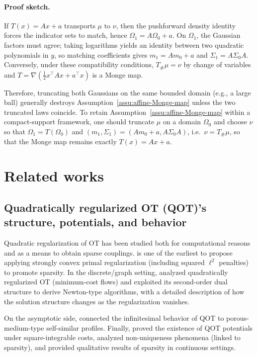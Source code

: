 \documentclass{article}
\theoremstyle{plain}
\theoremstyle{definition}
\theoremstyle{remark}
\numberwithin{equation}{section}
\begin{document}
\paragraph{Proof sketch.}
If $T(x)=Ax+a$ transports $\mu$ to $\nu$, then the pushforward density identity forces the indicator sets to match, hence $\Omega_1=A\Omega_0+a$.
On $\Omega_1$, the Gaussian factors must agree; taking logarithms yields an identity between two quadratic polynomials in $y$, so matching coefficients gives $m_1=Am_0+a$ and $\Sigma_1=A\Sigma_0A$.
Conversely, under these compatibility conditions, $T_\#\mu=\nu$ by change of variables and $T=\nabla(\frac12 x^\top Ax+a^\top x)$ is a Monge map.

Therefore, truncating both Gaussians on the same bounded domain (e.g., a large ball) generally destroys Assumption~\ref{assu:affine-Monge-map} unless the two truncated laws coincide.
To retain Assumption~\ref{assu:affine-Monge-map} within a compact-support framework, one should truncate $\mu$ on a domain $\Omega_0$ and choose $\nu$ so that $\Omega_1=T(\Omega_0)$ and $(m_1,\Sigma_1)=(Am_0+a,A\Sigma_0A)$, i.e.\ $\nu=T_\#\mu$, so that the Monge map remains exactly $T(x)=Ax+a$.
\section{Related works}\label{sec:related}
\subsection{Quadratically regularized OT (QOT)'s structure, potentials, and behavior}
Quadratic regularization of OT has been studied both for computational reasons and as a means to obtain sparse couplings.
\citet{blondel2018smooth} is one of the earliest to propose applying strongly convex primal regularization (including squared $\ell^2$ penalties) to promote sparsity. 
In the discrete/graph setting, \citet{essid2018quadratically} analyzed quadratically regularized OT (minimum-cost flows) and exploited its second-order dual structure to derive Newton-type algorithms, with a detailed description of how the solution structure changes as the regularization vanishes.

On the asymptotic side, \citet{garrizmolina2024infinitesimal} connected the infinitesimal behavior of QOT to porous-medium-type self-similar profiles.
Finally, \citet{nutz2025quadratically} proved the existence of QOT potentials under square-integrable costs, analyzed non-uniqueness phenomena (linked to sparsity), and provided qualitative results of sparsity in continuous settings.
\end{document}
